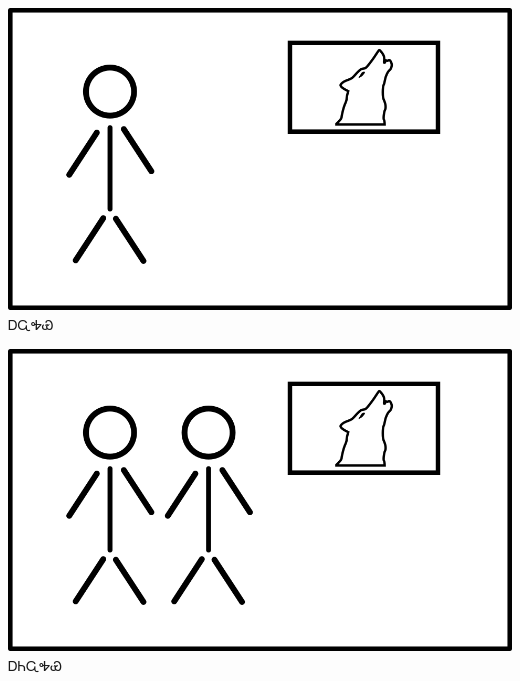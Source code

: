 \documentclass[avery8371]{flashcards}%
\begin{document}
    \begin{flashcard}{
        \includegraphics[width=0.95\columnwidth,height=.51\columnwidth,keepaspectratio]{../artwork/flags/awahaya-flag}
    }
        \Huge ᎠᏩᎭᏯ
    \end{flashcard}
    \begin{flashcard}{
        \includegraphics[width=0.95\columnwidth,height=.51\columnwidth,keepaspectratio]{../artwork/flags/aniwahaya-flag}
    }
        \Huge ᎠᏂᏩᎭᏯ
    \end{flashcard}
\end{document}
